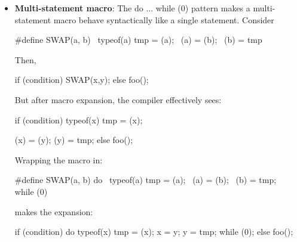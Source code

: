 \documentclass{report}
\begin{document}
\begin{itemize}
\begin{cppcode}
                X(INT,   "int")
                X(REAL,  "real")
                X(PLUS,  "+")
                X(MINUS, "-")
                \end{cppcode}
                \bigbreak \noindent 
                Then include that same file multiple times, redefining X differently each time.
                \bigbreak \noindent 
                \begin{cppcode}
                    enum Token {
                        #define X(name, text) TOKEN_##name,
                        #include "tokens.def"
                        #undef X
                    };
                \end{cppcode}
            \item \textbf{Multi-statement macro}:  The do { ... } while (0) pattern makes a multi-statement macro behave syntactically like a single statement. Consider
                \bigbreak \noindent 
                \begin{cppcode}
                    #define SWAP(a, b) \
                    typeof(a) tmp = (a); \
                    (a) = (b);           \
                    (b) = tmp 
                \end{cppcode}
                \bigbreak \noindent 
                Then,
                \bigbreak \noindent 
                \begin{cppcode}
                if (condition)
                    SWAP(x,y);
                else
                    foo();
                \end{cppcode}
                \bigbreak \noindent 
                But after macro expansion, the compiler effectively sees:
                \bigbreak \noindent 
                \begin{cppcode}
                    if (condition)
                        typeof(x) tmp = (x);

                    (x) = (y);
                    (y) = tmp;
                    else
                        foo();
                \end{cppcode}
                \bigbreak \noindent 
                Wrapping the macro in:
                \bigbreak \noindent 
                \begin{cppcode}
                    #define SWAP(a, b) do { \
                        typeof(a) tmp = (a); \
                        (a) = (b);           \
                        (b) = tmp;           \
                    } while (0)
                \end{cppcode}
                \bigbreak \noindent 
                makes the expansion:
                \bigbreak \noindent 
                \begin{cppcode}
                    if (condition)
                    do {
                        typeof(x) tmp = (x);
                        x = y;
                        y = tmp;
                    } while (0);
                    else
                        foo();
                \end{cppcode}
        \end{itemize}
\end{document}
